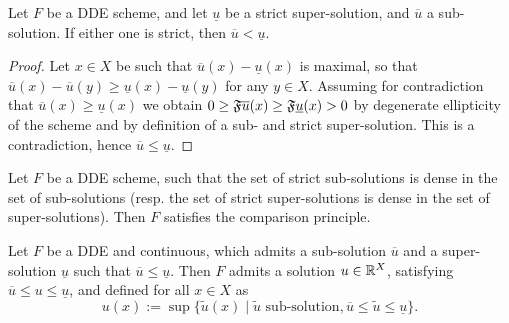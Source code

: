 
\begin{proposition}
Let $F$ be a DDE scheme, and let $\underline u$ be a strict super-solution, and $\overline u$ a sub-solution. If either one is strict, then $\overline u < \underline u$. 
\end{proposition}

\begin{proof}
Let $x \in X$ be such that $\overline u(x) - \underline u(x)$ is maximal, so that $\overline u(x)-\overline u(y) \geq \underline u(x)-\underline u(y)$ for any $y \in X$. Assuming for contradiction that $\overline u(x) \geq \underline u(x)$ we obtain $0\geq \mathfrak{F} \overline u(x) \geq \mathfrak{F} \underline u(x)>0$ by degenerate ellipticity of the scheme and by definition of a sub- and strict super-solution. This is a contradiction, hence $\overline u \leq \underline u$. %
\end{proof}



\begin{corollary}
	Let $F$ be a DDE scheme, such that the set of strict sub-solutions is dense in the set of sub-solutions (resp. the set of strict super-solutions is dense in the set of super-solutions). 
	Then $F$ satisfies the comparison principle.
\end{corollary}

\begin{proposition}
	Let $F$ be a DDE and continuous, which admits a sub-solution $\overline u$ and a super-solution $\underline u$ such that $\overline u \leq \underline u$.
	Then $F$ admits a solution $u \in \mathbb{R}^X$, satisfying $\overline u \leq u \leq \underline u$, and defined for all $x \in X$ as
	\begin{equation}
		u(x) := \sup\{ \tilde u(x)\mid \tilde u \text{ sub-solution}, \overline u \leq \tilde u \leq \underline u\}.
	\end{equation}
\end{proposition}

